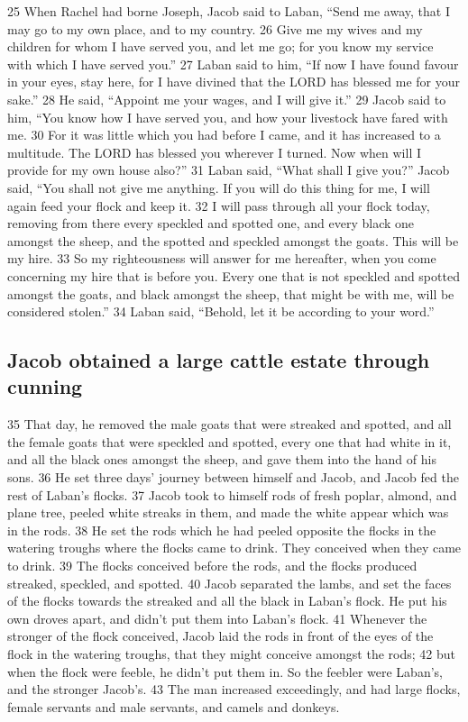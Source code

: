 {25} When Rachel had borne Joseph, Jacob said to Laban, ``Send me away,
that I may go to my own place, and to my country. {26} Give me my wives
and my children for whom I have served you, and let me go; for you know
my service with which I have served you.'' {27} Laban said to him, ``If
now I have found favour in your eyes, stay here, for I have divined that
the LORD has blessed me for your sake.'' {28} He said, ``Appoint me your
wages, and I will give it.'' {29} Jacob said to him, ``You know how I
have served you, and how your livestock have fared with me. {30} For it
was little which you had before I came, and it has increased to a
multitude. The LORD has blessed you wherever I turned. Now when will I
provide for my own house also?'' {31} Laban said, ``What shall I give
you?'' Jacob said, ``You shall not give me anything. If you will do this
thing for me, I will again feed your flock and keep it. {32} I will pass
through all your flock today, removing from there every speckled and
spotted one, and every black one amongst the sheep, and the spotted and
speckled amongst the goats. This will be my hire. {33} So my
righteousness will answer for me hereafter, when you come concerning my
hire that is before you. Every one that is not speckled and spotted
amongst the goats, and black amongst the sheep, that might be with me,
will be considered stolen.'' {34} Laban said, ``Behold, let it be
according to your word.''

\hypertarget{jacob-obtained-a-large-cattle-estate-through-cunning}{%
\subsection{Jacob obtained a large cattle estate through
cunning}\label{jacob-obtained-a-large-cattle-estate-through-cunning}}

{35} That day, he removed the male goats that were streaked and spotted,
and all the female goats that were speckled and spotted, every one that
had white in it, and all the black ones amongst the sheep, and gave them
into the hand of his sons. {36} He set three days' journey between
himself and Jacob, and Jacob fed the rest of Laban's flocks. {37} Jacob
took to himself rods of fresh poplar, almond, and plane tree, peeled
white streaks in them, and made the white appear which was in the rods.
{38} He set the rods which he had peeled opposite the flocks in the
watering troughs where the flocks came to drink. They conceived when
they came to drink. {39} The flocks conceived before the rods, and the
flocks produced streaked, speckled, and spotted. {40} Jacob separated
the lambs, and set the faces of the flocks towards the streaked and all
the black in Laban's flock. He put his own droves apart, and didn't put
them into Laban's flock. {41} Whenever the stronger of the flock
conceived, Jacob laid the rods in front of the eyes of the flock in the
watering troughs, that they might conceive amongst the rods; {42} but
when the flock were feeble, he didn't put them in. So the feebler were
Laban's, and the stronger Jacob's. {43} The man increased exceedingly,
and had large flocks, female servants and male servants, and camels and
donkeys.

